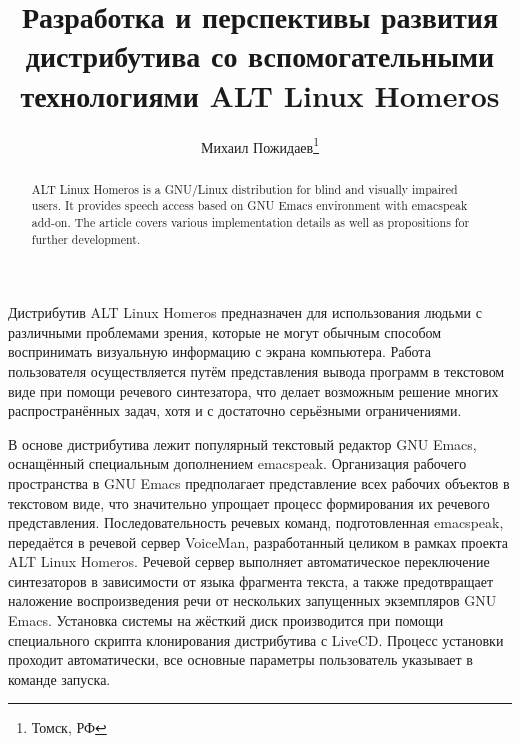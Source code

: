 \documentclass[10pt, a5paper]{article}
\begin{document}
\title{Разработка и перспективы развития дистрибутива со вспомогательными технологиями ALT Linux Homeros}%

\author{Михаил Пожидаев\footnote{Томск, РФ}}
\maketitle

\begin{abstract}
ALT Linux Homeros is a GNU/Linux distribution for blind and visually impaired users. It provides speech access based on GNU Emacs environment with emacspeak add-on. The article covers various implementation details as well as propositions for further development.
\end{abstract}

Дистрибутив ALT Linux Homeros предназначен для использования людьми с различными проблемами зрения, которые не могут обычным способом воспринимать визуальную информацию с экрана компьютера. Работа пользователя осуществляется путём представления вывода программ в текстовом виде при помощи речевого синтезатора, что делает возможным решение многих распространённых задач, хотя и с достаточно серьёзными ограничениями.

В основе дистрибутива лежит популярный текстовый редактор GNU Emacs, оснащённый специальным дополнением emacspeak. Организация рабочего пространства в GNU Emacs предполагает представление всех рабочих объектов в текстовом виде, что значительно упрощает процесс формирования их речевого представления. Последовательность речевых команд, подготовленная emacspeak, передаётся в речевой сервер VoiceMan, разработанный целиком в рамках проекта ALT Linux Homeros. Речевой сервер выполняет автоматическое переключение синтезаторов в зависимости от языка фрагмента текста, а также предотвращает наложение воспроизведения речи от нескольких запущенных экземпляров GNU Emacs. Установка системы на жёсткий диск производится при помощи специального скрипта клонирования дистрибутива с LiveCD. Процесс установки проходит автоматически, все основные параметры пользователь указывает в команде запуска.
\end{document}
